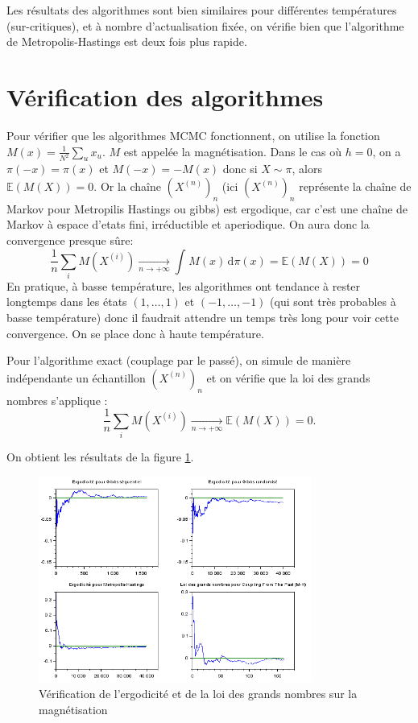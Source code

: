 \documentclass[a4paper,11pt]{article}
\begin{document}
Les résultats des algorithmes sont bien similaires pour différentes températures (sur-critiques), et à nombre d'actualisation fixée, on vérifie bien que l'algorithme de Metropolis-Hastings est deux fois plus rapide.

\section{Vérification des algorithmes}\label{sec:check}

Pour vérifier que les algorithmes MCMC fonctionnent, on utilise la fonction $M(x) = \frac{1}{N^2} \sum_u x_u$. $M$ est appelée la magnétisation. Dans le cas où $h = 0$, on a $\pi(-x) = \pi(x)$ et $M(-x) = -M(x)$ donc si $X \sim \pi$, alors $\mathbb E(M(X)) = 0$. Or la chaîne $(X^{(n)})_n$ (ici $(X^{(n)})_n$ représente la chaîne de Markov pour Metropilis Hastings ou gibbs) est ergodique, car c'est une chaîne de Markov à espace d'etats fini, irréductible et aperiodique. On aura donc la convergence presque sûre:
$$\frac{1}{n} \sum_i M(X^{(i)}) \xrightarrow[n \rightarrow +\infty]{} \displaystyle \int_{}^{} M(x) \, \mathrm{d}\pi(x)=\mathbb E(M(X)) = 0$$
En pratique, à basse température, les algorithmes ont tendance à rester longtemps dans les états $(1,\hdots,1)$ et $(-1,\hdots,-1)$ (qui sont très probables à basse température) donc il faudrait attendre un temps très long pour voir cette convergence. On se place donc à haute température.

Pour l'algorithme exact (couplage par le passé), on simule de manière indépendante un échantillon $(X^{(n)})_n$ et on vérifie que la loi des grands nombres s'applique :
$$\frac{1}{n} \sum_i M(X^{(i)}) \xrightarrow[n \rightarrow +\infty]{} \mathbb E(M(X)) = 0.$$

On obtient les résultats de la figure \ref{fig:ergodic}.
\begin{figure}[!htbp]
	\centering
	\includegraphics[width=0.8\textwidth]{ergodicite_magnetisation.png}
	\caption{Vérification de l'ergodicité et de la loi des grands nombres sur la magnétisation}
	\label{fig:ergodic}
\end{figure}
\end{document}
